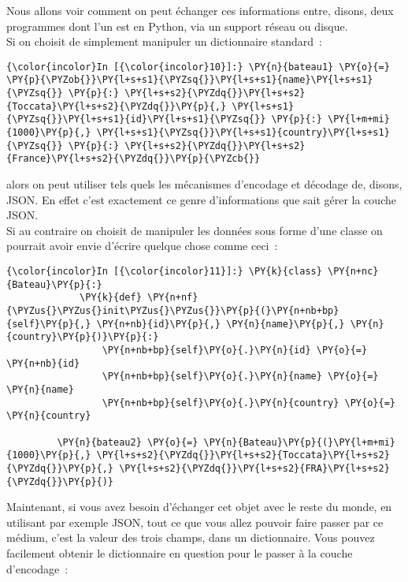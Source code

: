 Nous allons voir comment on peut échanger ces informations entre,
disons, deux programmes dont l'un est en Python, via un support réseau
ou disque.\\

    Si on choisit de simplement manipuler un dictionnaire standard~:

    \begin{Verbatim}[commandchars=\\\{\}]
{\color{incolor}In [{\color{incolor}10}]:} \PY{n}{bateau1} \PY{o}{=} \PY{p}{\PYZob{}}\PY{l+s+s1}{\PYZsq{}}\PY{l+s+s1}{name}\PY{l+s+s1}{\PYZsq{}} \PY{p}{:} \PY{l+s+s2}{\PYZdq{}}\PY{l+s+s2}{Toccata}\PY{l+s+s2}{\PYZdq{}}\PY{p}{,} \PY{l+s+s1}{\PYZsq{}}\PY{l+s+s1}{id}\PY{l+s+s1}{\PYZsq{}} \PY{p}{:} \PY{l+m+mi}{1000}\PY{p}{,} \PY{l+s+s1}{\PYZsq{}}\PY{l+s+s1}{country}\PY{l+s+s1}{\PYZsq{}} \PY{p}{:} \PY{l+s+s2}{\PYZdq{}}\PY{l+s+s2}{France}\PY{l+s+s2}{\PYZdq{}}\PY{p}{\PYZcb{}}
\end{Verbatim}


    alors on peut utiliser tels quels les mécanismes d'encodage et décodage
de, disons, JSON. En effet c'est exactement ce genre d'informations que
sait gérer la couche JSON.\\

    Si au contraire on choisit de manipuler les données sous forme d'une
classe on pourrait avoir envie d'écrire quelque chose comme ceci~:

    \begin{Verbatim}[commandchars=\\\{\}]
{\color{incolor}In [{\color{incolor}11}]:} \PY{k}{class} \PY{n+nc}{Bateau}\PY{p}{:}
             \PY{k}{def} \PY{n+nf}{\PYZus{}\PYZus{}init\PYZus{}\PYZus{}}\PY{p}{(}\PY{n+nb+bp}{self}\PY{p}{,} \PY{n+nb}{id}\PY{p}{,} \PY{n}{name}\PY{p}{,} \PY{n}{country}\PY{p}{)}\PY{p}{:}
                 \PY{n+nb+bp}{self}\PY{o}{.}\PY{n}{id} \PY{o}{=} \PY{n+nb}{id}
                 \PY{n+nb+bp}{self}\PY{o}{.}\PY{n}{name} \PY{o}{=} \PY{n}{name}
                 \PY{n+nb+bp}{self}\PY{o}{.}\PY{n}{country} \PY{o}{=} \PY{n}{country}
                 
         \PY{n}{bateau2} \PY{o}{=} \PY{n}{Bateau}\PY{p}{(}\PY{l+m+mi}{1000}\PY{p}{,} \PY{l+s+s2}{\PYZdq{}}\PY{l+s+s2}{Toccata}\PY{l+s+s2}{\PYZdq{}}\PY{p}{,} \PY{l+s+s2}{\PYZdq{}}\PY{l+s+s2}{FRA}\PY{l+s+s2}{\PYZdq{}}\PY{p}{)}
\end{Verbatim}


    Maintenant, si vous avez besoin d'échanger cet objet avec le reste du
monde, en utilisant par exemple JSON, tout ce que vous allez pouvoir
faire passer par ce médium, c'est la valeur des trois champs, dans un
dictionnaire. Vous pouvez facilement obtenir le dictionnaire en question
pour le passer à la couche d'encodage~:

